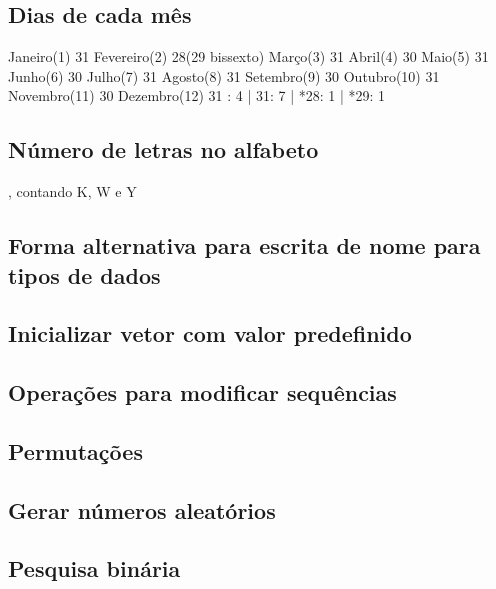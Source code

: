 \documentclass[a4paper,12pt]{article}
\begin{document}
\subsection{Dias de cada mês}
\noindent Janeiro(1) 31
\newline\noindent Fevereiro(2) 28(29 bissexto)
\newline\noindent Março(3) 31
\newline\noindent Abril(4) 30
\newline\noindent Maio(5) 31
\newline\noindent Junho(6) 30
\newline\noindent Julho(7) 31
\newline\noindent Agosto(8) 31
\newline\noindent Setembro(9) 30
\newline\noindent Outubro(10) 31
\newline\noindent Novembro(11) 30
\newline\noindent Dezembro(12) 31
\newline{}: 4 | 31: 7 | *28: 1 | *29: 1

\subsection{Número de letras no alfabeto}
, contando K, W e Y

\subsection{Forma alternativa para escrita de nome para tipos de dados}

\subsection{Inicializar vetor com valor predefinido}

\subsection{Operações para modificar sequências}

\subsection{Permutações}

\subsection{Gerar números aleatórios}

\subsection{Pesquisa binária}
\end{document}

